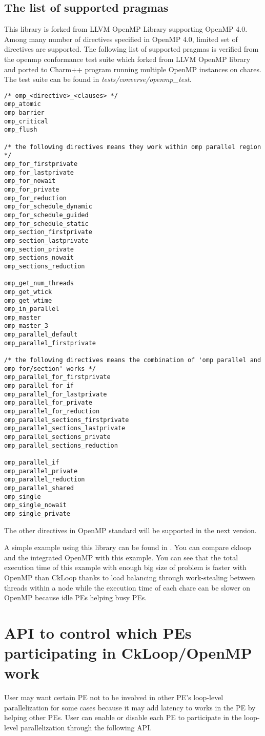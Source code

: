 \subsection{The list of supported pragmas}
This library is forked from LLVM OpenMP Library supporting OpenMP 4.0. Among many number of 
directives specified in OpenMP 4.0,  limited set of directives are supported. 
The following list of supported pragmas is verified from the openmp conformance test suite which forked from LLVM OpenMP library and ported to Charm++ program running multiple OpenMP instances on chares. The test suite can be found in \emph{tests/converse/openmp\_test}.
\begin{verbatim}
/* omp_<directive>_<clauses> */
omp_atomic
omp_barrier
omp_critical
omp_flush

/* the following directives means they work within omp parallel region */
omp_for_firstprivate
omp_for_lastprivate
omp_for_nowait
omp_for_private
omp_for_reduction
omp_for_schedule_dynamic
omp_for_schedule_guided
omp_for_schedule_static
omp_section_firstprivate
omp_section_lastprivate
omp_section_private
omp_sections_nowait
omp_sections_reduction

omp_get_num_threads
omp_get_wtick
omp_get_wtime
omp_in_parallel
omp_master
omp_master_3
omp_parallel_default
omp_parallel_firstprivate

/* the following directives means the combination of 'omp parallel and omp for/section' works */
omp_parallel_for_firstprivate
omp_parallel_for_if
omp_parallel_for_lastprivate
omp_parallel_for_private
omp_parallel_for_reduction
omp_parallel_sections_firstprivate
omp_parallel_sections_lastprivate
omp_parallel_sections_private
omp_parallel_sections_reduction

omp_parallel_if
omp_parallel_private
omp_parallel_reduction
omp_parallel_shared
omp_single
omp_single_nowait
omp_single_private
\end{verbatim}
The other directives in OpenMP standard will be supported in the next version.

A simple example using this library can be found in . You can compare ckloop 
and the integrated OpenMP with this example. You can see that the total execution time of 
this example with enough big size of problem is faster with OpenMP than CkLoop thanks to 
load balancing through work-stealing between threads within a node while the execution 
time of each chare can be slower on OpenMP because idle PEs helping busy PEs.
\section{API to control which PEs participating in CkLoop/OpenMP work}
User may want certain PE not to be involved in other PE's loop-level parallelization for some cases because it may add latency to works in the PE by helping other PEs. User can enable or disable each PE to participate in the loop-level parallelization through the following API.

